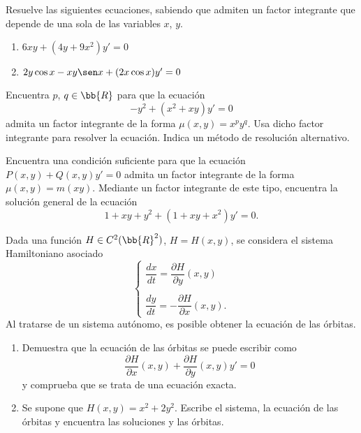 \begin{ejercicio}
    Resuelve las siguientes ecuaciones, sabiendo que admiten un factor integrante que depende de una sola de las
    variables $x$, $y$.
    \begin{enumerate}
        \item $6xy + (4y + 9x^2)y' = 0$
        \item $2y \cos x - xy \sen x + (2x \cos x)y' = 0$
    \end{enumerate}
\end{ejercicio}

\begin{ejercicio}
    Encuentra $p$, $q \in \bb{R}$ para que la ecuación
    \[
        -y^2 + (x^2 + xy)y' = 0
    \]
    admita un factor integrante de la forma $\mu(x, y) = x^p y^q$. Usa dicho factor integrante para resolver la ecuación. Indica
    un método de resolución alternativo.
\end{ejercicio}

\begin{ejercicio}
    Encuentra una condición suficiente para que la ecuación $P(x, y) + Q(x, y)y' = 0$ admita un factor integrante de la
    forma $\mu(x, y) = m(xy)$. Mediante un factor integrante de este tipo, encuentra la solución general de la ecuación
    \[
        1 + xy + y^2 + (1 + xy + x^2)y' = 0.
    \]
\end{ejercicio}

\begin{ejercicio}
    Dada una función $H \in C^2(\bb{R}^2)$, $H = H(x, y)$, se considera el sistema Hamiltoniano asociado
    \[
        \begin{cases}
            \dfrac{dx}{dt} = \dfrac{\partial H}{\partial y}(x, y) \\ \\
            \dfrac{dy}{dt} = -\dfrac{\partial H}{\partial x}(x, y).
        \end{cases}
    \]
    Al tratarse de un sistema autónomo, es posible obtener la ecuación de las órbitas.
    \begin{enumerate}
        \item Demuestra que la ecuación de las órbitas se puede escribir como
        \[
            \frac{\partial H}{\partial x}(x, y) + \frac{\partial H}{\partial y}(x, y)y' = 0
        \]
        y comprueba que se trata de una ecuación exacta.
        \item Se supone que $H(x, y) = x^2 + 2y^2$. Escribe el sistema, la ecuación de las órbitas y encuentra las soluciones y
        las órbitas.
    \end{enumerate}
\end{ejercicio}

